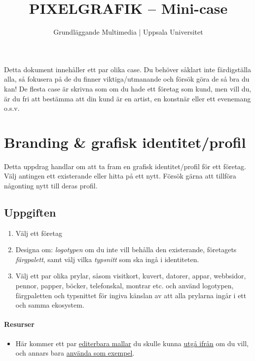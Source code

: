 \documentclass{article}
\begin{document}
  \title{ PIXELGRAFIK -- Mini-case }
  \author{ Grundläggande Multimedia | Uppsala Universitet }
  \date{}
  \maketitle

  \paragraph{}
  Detta dokument innehåller ett par olika case. Du behöver såklart inte färdigställa alla, så fokusera på de du finner viktiga/utmanande och försök göra de så bra du kan! De flesta case är skrivna som om du hade ett företag som kund, men vill du, är du fri att bestämma att din kund är en artist, en konstnär eller ett evenemang o.s.v.


  \newpage
  \section{ Branding \& grafisk identitet/profil }
    \paragraph{}
    Detta uppdrag handlar om att ta fram en grafisk identitet/profil för ett företag. Välj antingen ett existerande eller hitta på ett nytt. Försök gärna att tillföra någonting nytt till deras profil.

    \subsection*{ Uppgiften }
      \begin{enumerate}
        \item Välj ett företag
        \item Designa om: \emph{logotypen} om du inte vill behålla den existerande, företagets \emph{färgpalett}, samt välj vilka \emph{typsnitt} som ska ingå i identiteten.
        \item Välj ett par olika prylar, såsom visitkort, kuvert, datorer, appar, webbsidor, pennor, papper, böcker, telefonskal, montrar etc. och använd logotypen, färgpaletten och typsnittet för ingiva känslan av att alla prylarna ingår i ett och samma ekosystem.
      \end{enumerate}

      \paragraph{Resurser}
        \begin{itemize}
          \item
            Här kommer
            ett par
            \href{http://graphicburger.com/branding-identity-mock-up-vol-4/}{editerbara mallar}
            du skulle kunna
            \href{http://graphicburger.com/branding-identity-mock-up-vol-2/}{utgå ifrån}
            om du vill,
            och annars bara
            \href{http://graphicburger.com/identity-branding-mock-up-vol-3/}{använda som exempel}.
        \end{itemize}
\end{document}
